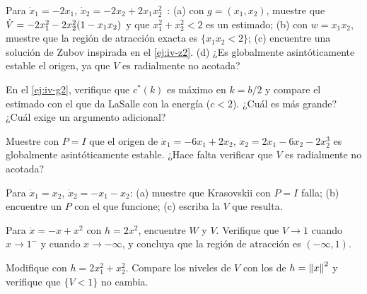\begin{problema}\label{prob:iv-slotine}
Para $\dot x_1=-2x_1$, $\dot x_2=-2x_2+2x_1x_2^2$~\citep{SlLi91}: (a) con $g=(x_1,x_2)$, muestre que $\dot V=-2x_1^2-2x_2^2(1-x_1x_2)$ y que $x_1^2+x_2^2<2$ es un estimado; (b) con $w=x_1x_2$, muestre que la región de atracción exacta es $\{x_1x_2<2\}$; (c) encuentre una solución de Zubov inspirada en el \cref{ej:iv-z2}. (d) ¿Es globalmente asintóticamente estable el origen, ya que $V$ es radialmente no acotada?
\end{problema}

\begin{problema}\label{prob:iv-pendulo}
En el \cref{ej:iv-g2}, verifique que $c^*(k)$ es máximo en $k=b/2$ y compare el estimado con el que da LaSalle con la energía ($c<2$). ¿Cuál es más grande? ¿Cuál exige un argumento adicional?
\end{problema}

\begin{problema}\label{prob:iv-krasovskii}
Muestre con $P=I$ que el origen de $\dot x_1=-6x_1+2x_2$, $\dot x_2=2x_1-6x_2-2x_2^3$ es globalmente asintóticamente estable. ¿Hace falta verificar que $V$ es radialmente no acotada?
\end{problema}

\begin{problema}[escoger $P$]\label{prob:iv-escogerP}
Para $\dot x_1=x_2$, $\dot x_2=-x_1-x_2$: (a) muestre que Krasovskii con $P=I$ falla; (b) encuentre un $P$ con el que funcione; (c) escriba la $V$ que resulta.
\end{problema}

\begin{problema}\label{prob:iv-zubov1d}
Para $\dot x=-x+x^2$ con $h=2x^2$, encuentre $W$ y $V$. Verifique que $V\to1$ cuando $x\to1^-$ y cuando $x\to-\infty$, y concluya que la región de atracción es $(-\infty,1)$.
\end{problema}

\begin{problema}\label{prob:iv-zubovh}
\etiquetaM{} Modifique  con $h=2x_1^2+x_2^2$. Compare los niveles de $V$ con los de $h=\left\lVert x\right\rVert^2$ y verifique que $\{V<1\}$ no cambia.
\end{problema}

